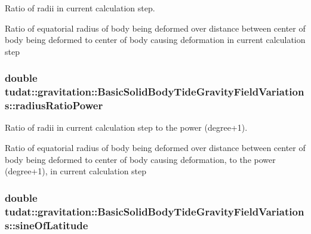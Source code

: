 Ratio of radii in current calculation step. 

Ratio of equatorial radius of body being deformed over distance between center of body being deformed to center of body causing deformation in current calculation step 
\subsubsection[{\texorpdfstring{radius\+Ratio\+Power}{radiusRatioPower}}]{\setlength{\rightskip}{0pt plus 5cm}double tudat\+::gravitation\+::\+Basic\+Solid\+Body\+Tide\+Gravity\+Field\+Variations\+::radius\+Ratio\+Power\hspace{0.3cm}{\ttfamily [protected]}}\hypertarget{classtudat_1_1gravitation_1_1BasicSolidBodyTideGravityFieldVariations_a6646e9fc25280255248df924c8fcc6ea}{}\label{classtudat_1_1gravitation_1_1BasicSolidBodyTideGravityFieldVariations_a6646e9fc25280255248df924c8fcc6ea}


Ratio of radii in current calculation step to the power (degree+1). 

Ratio of equatorial radius of body being deformed over distance between center of body being deformed to center of body causing deformation, to the power (degree+1), in current calculation step 
\subsubsection[{\texorpdfstring{sine\+Of\+Latitude}{sineOfLatitude}}]{\setlength{\rightskip}{0pt plus 5cm}double tudat\+::gravitation\+::\+Basic\+Solid\+Body\+Tide\+Gravity\+Field\+Variations\+::sine\+Of\+Latitude\hspace{0.3cm}{\ttfamily [protected]}}\hypertarget{classtudat_1_1gravitation_1_1BasicSolidBodyTideGravityFieldVariations_adf49e1f8b787b2d8f3df4a8f9ba07d19}{}\label{classtudat_1_1gravitation_1_1BasicSolidBodyTideGravityFieldVariations_adf49e1f8b787b2d8f3df4a8f9ba07d19}



